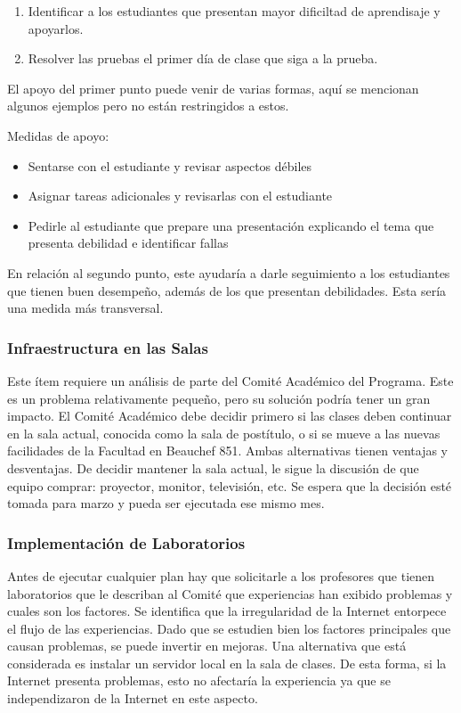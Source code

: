 \begin{enumerate}
\item Identificar a los estudiantes que presentan mayor dificiltad de aprendisaje y apoyarlos. 
\item Resolver las pruebas el primer día de clase que siga a la prueba. 
\end{enumerate}

El apoyo del primer punto puede venir de varias formas, aquí se mencionan algunos ejemplos pero no están restringidos a estos.

Medidas de apoyo:
\begin{itemize}
\item Sentarse con el estudiante y revisar aspectos débiles
\item Asignar tareas adicionales y revisarlas con el estudiante
\item Pedirle al estudiante que prepare una presentación explicando el tema que presenta debilidad e identificar fallas
\end{itemize}

En relación al segundo punto, este ayudaría a darle seguimiento a los estudiantes que tienen buen desempeño, además de los que presentan 
debilidades. Esta sería una medida más transversal.


\subsubsection{Infraestructura en las Salas}

Este ítem requiere un análisis de parte del Comité Académico del Programa. Este es un problema relativamente pequeño, pero su solución podría
tener un gran impacto. El Comité Académico debe decidir primero si las clases deben continuar en la sala actual, conocida como la sala de 
postítulo, o si se mueve a las nuevas facilidades de la Facultad en Beauchef 851. Ambas alternativas tienen ventajas y desventajas. De decidir mantener la sala actual, le sigue la discusión de que equipo comprar: proyector, monitor, televisión, etc. Se espera que la decisión esté tomada para marzo y pueda ser ejecutada ese mismo mes.

\subsubsection{Implementación de Laboratorios}

Antes de ejecutar cualquier plan hay que solicitarle a los profesores que tienen laboratorios que le describan al Comité que experiencias han 
exibido problemas y cuales son los factores. Se identifica que la irregularidad de la Internet entorpece el flujo de las experiencias. Dado que se estudien bien los factores principales que causan problemas, se puede invertir en mejoras. Una alternativa que está considerada es instalar un servidor local en la sala de clases. De esta forma, si la Internet presenta problemas, esto no afectaría la experiencia ya que se independizaron de la Internet en este aspecto.

